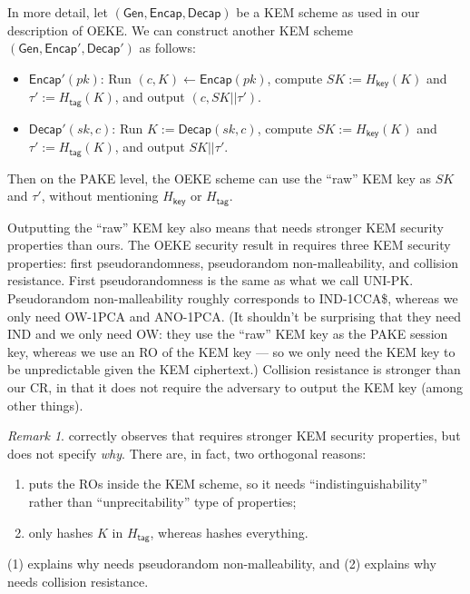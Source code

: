 \documentclass{article}
\theoremstyle{plain}
\theoremstyle{definition}
\theoremstyle{remark}
\newtheorem{remark}{Remark}
\newcommand{\Gen}{\mathsf{Gen}}
\newcommand{\Encap}{\mathsf{Encap}}
\newcommand{\Decap}{\mathsf{Decap}}
\newcommand{\Hkey}{H_\mathsf{key}}
\newcommand{\Htag}{H_\mathsf{tag}}
\begin{document}
In more detail, let $(\Gen,\Encap,\Decap)$ be a KEM scheme as used in our description of OEKE. We can construct another KEM scheme $(\Gen,\Encap',\Decap')$ as follows:
\begin{itemize}
  \item $\Encap'(pk)$: Run $(c,K) \gets \Encap(pk)$, compute $SK := \Hkey(K)$ and $\tau' := \Htag(K)$, and output $(c,SK||\tau')$.
  \item $\Decap'(sk,c)$: Run $K := \Decap(sk,c)$, compute $SK := \Hkey(K)$ and $\tau' := \Htag(K)$, and output $SK||\tau'$.
\end{itemize}
Then on the PAKE level, the OEKE scheme can use the ``raw'' KEM key as $SK$ and $\tau'$, without mentioning $\Hkey$ or $\Htag$.

Outputting the ``raw'' KEM key also means that \cite{EC:JanRoyXu25} needs stronger KEM security properties than ours. The OEKE security result in \cite{EC:JanRoyXu25} requires three KEM security properties: first pseudorandomness, pseudorandom non-malleability, and collision resistance. First pseudorandomness is the same as what we call UNI-PK. Pseudorandom non-malleability roughly corresponds to IND-1CCA\$, whereas we only need OW-1PCA and ANO-1PCA. (It shouldn't be surprising that they need IND and we only need OW: they use the ``raw'' KEM key as the PAKE session key, whereas we use an RO of the KEM key --- so we only need the KEM key to be unpredictable given the KEM ciphertext.) Collision resistance is stronger than our CR, in that it does not require the adversary to output the KEM key (among other things).

\begin{remark}
\cite[Section~1]{EPRINT:ArrBarJar25} correctly observes that \cite{EC:JanRoyXu25} requires stronger KEM security properties, but does not specify \emph{why}. There are, in fact, two orthogonal reasons:
\begin{enumerate}
  \item \cite{EC:JanRoyXu25} puts the ROs inside the KEM scheme, so it needs ``indistinguishability'' rather than ``unprecitability'' type of properties;
  \item \cite{EC:JanRoyXu25} only hashes $K$ in $\Htag$, whereas \cite{EPRINT:ArrBarJar25} hashes everything.
\end{enumerate}
(1) explains why \cite{EC:JanRoyXu25} needs pseudorandom non-malleability, and (2) explains why \cite{EC:JanRoyXu25} needs collision resistance.
\end{remark}
\end{document}
